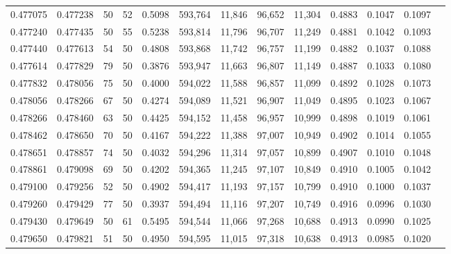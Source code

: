\begin{tabular}{rrrrrrrrrrrrr}
0.477075 & 0.477238 &    50 &  52 &                                     0.5098 & 593,764 &  11,846 &  96,652 &  11,304 & 0.4883 & 0.1047 & 0.1097 \\
0.477240 & 0.477435 &    50 &  55 &                                     0.5238 & 593,814 &  11,796 &  96,707 &  11,249 & 0.4881 & 0.1042 & 0.1093 \\
0.477440 & 0.477613 &    54 &  50 &                                     0.4808 & 593,868 &  11,742 &  96,757 &  11,199 & 0.4882 & 0.1037 & 0.1088 \\
0.477614 & 0.477829 &    79 &  50 &                                     0.3876 & 593,947 &  11,663 &  96,807 &  11,149 & 0.4887 & 0.1033 & 0.1080 \\
0.477832 & 0.478056 &    75 &  50 &                                     0.4000 & 594,022 &  11,588 &  96,857 &  11,099 & 0.4892 & 0.1028 & 0.1073 \\
0.478056 & 0.478266 &    67 &  50 &                                     0.4274 & 594,089 &  11,521 &  96,907 &  11,049 & 0.4895 & 0.1023 & 0.1067 \\
0.478266 & 0.478460 &    63 &  50 &                                     0.4425 & 594,152 &  11,458 &  96,957 &  10,999 & 0.4898 & 0.1019 & 0.1061 \\
0.478462 & 0.478650 &    70 &  50 &                                     0.4167 & 594,222 &  11,388 &  97,007 &  10,949 & 0.4902 & 0.1014 & 0.1055 \\
0.478651 & 0.478857 &    74 &  50 &                                     0.4032 & 594,296 &  11,314 &  97,057 &  10,899 & 0.4907 & 0.1010 & 0.1048 \\
0.478861 & 0.479098 &    69 &  50 &                                     0.4202 & 594,365 &  11,245 &  97,107 &  10,849 & 0.4910 & 0.1005 & 0.1042 \\
0.479100 & 0.479256 &    52 &  50 &                                     0.4902 & 594,417 &  11,193 &  97,157 &  10,799 & 0.4910 & 0.1000 & 0.1037 \\
0.479260 & 0.479429 &    77 &  50 &                                     0.3937 & 594,494 &  11,116 &  97,207 &  10,749 & 0.4916 & 0.0996 & 0.1030 \\
0.479430 & 0.479649 &    50 &  61 &                                     0.5495 & 594,544 &  11,066 &  97,268 &  10,688 & 0.4913 & 0.0990 & 0.1025 \\
0.479650 & 0.479821 &    51 &  50 &                                     0.4950 & 594,595 &  11,015 &  97,318 &  10,638 & 0.4913 & 0.0985 & 0.1020 \\

\end{tabular}
